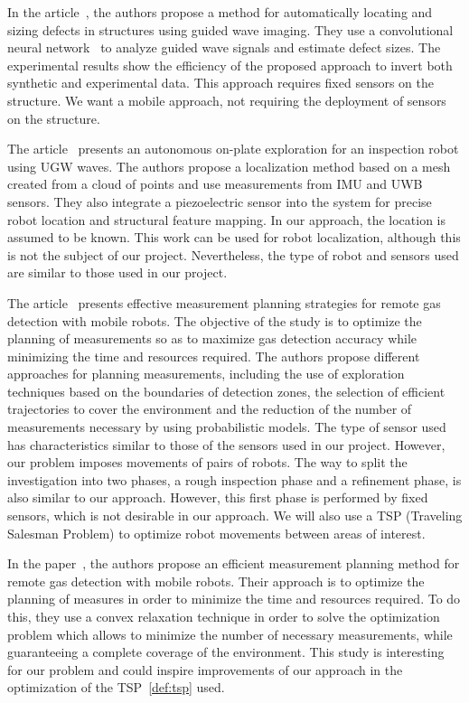 In the article~\cite{articlesvsdf}, the authors propose a method for automatically locating and sizing defects in structures using guided wave imaging.
They use a convolutional neural network~\cite{enwiki:1159408824} to analyze guided wave signals and estimate defect sizes.
The experimental results show the efficiency of the proposed approach to invert both synthetic and experimental data.
This approach requires fixed sensors on the structure.
We want a mobile approach, not requiring the deployment of sensors on the structure.

The article~\cite{9568841} presents an autonomous on-plate exploration for an inspection robot using UGW waves.
The authors propose a localization method based on a mesh created from a cloud of points and use measurements from IMU and UWB sensors.
They also integrate a piezoelectric sensor into the system for precise robot location and structural feature mapping.
In our approach, the location is assumed to be known.
This work can be used for robot localization, although this is not the subject of our project.
Nevertheless, the type of robot and sensors used are similar to those used in our project.

The article~\cite{7487624} presents effective measurement planning strategies for remote gas detection with mobile robots.
The objective of the study is to optimize the planning of measurements so as to maximize gas detection accuracy while minimizing the time and resources required.
The authors propose different approaches for planning measurements, including the use of exploration techniques based on the boundaries of detection zones, the selection of efficient trajectories to cover the environment and the reduction of the number of measurements necessary by using probabilistic models.
The type of sensor used has characteristics similar to those of the sensors used in our project.
However, our problem imposes movements of pairs of robots.
The way to split the investigation into two phases, a rough inspection phase and a refinement phase, is also similar to our approach.
However, this first phase is performed by fixed sensors, which is not desirable in our approach.
We will also use a TSP (Traveling Salesman Problem) to optimize robot movements between areas of interest.

In the paper~\cite{7139673}, the authors propose an efficient measurement planning method for remote gas detection with mobile robots.
Their approach is to optimize the planning of measures in order to minimize the time and resources required.
To do this, they use a convex relaxation technique in order to solve the optimization problem which allows to minimize the number of necessary measurements, while guaranteeing a complete coverage of the environment.
This study is interesting for our problem and could inspire improvements of our approach in the optimization of the TSP~\ref{def:tsp} used.

